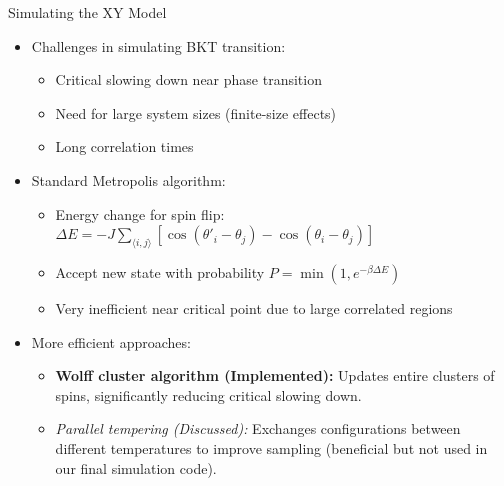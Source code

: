 \documentclass[11pt,aspectratio=169]{beamer}
\begin{document}
\begin{frame}{Simulating the XY Model}
    \begin{itemize}
        \item Challenges in simulating BKT transition:
            \begin{itemize}
                \item Critical slowing down near phase transition
                \item Need for large system sizes (finite-size effects)
                \item Long correlation times
            \end{itemize}
        \pause
        \item Standard Metropolis algorithm:
            \begin{itemize}
                \item Energy change for spin flip: $\Delta E = -J \sum_{\langle i,j \rangle} [\cos(\theta'_i - \theta_j) - \cos(\theta_i - \theta_j)]$
                \item Accept new state with probability $P = \min(1, e^{-\beta \Delta E})$
                \item Very inefficient near critical point due to large correlated regions
            \end{itemize}
        \pause
        \item More efficient approaches:
            \begin{itemize}
                \item \textbf{Wolff cluster algorithm (Implemented):} Updates entire clusters of spins, significantly reducing critical slowing down.
                \item \textit{Parallel tempering (Discussed):} Exchanges configurations between different temperatures to improve sampling (beneficial but not used in our final simulation code).
            \end{itemize}
    \end{itemize}
\end{frame}
\end{document}
